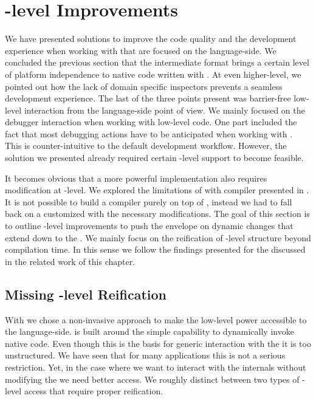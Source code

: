 \section{\VM-level Improvements}
We have presented solutions to improve the code quality and the development experience when working with \B that are focused on the language-side.
We concluded the previous section that the \VCPU intermediate format brings a certain level of platform independence to native code written with \B.
At even higher-level, we pointed out how the lack of domain specific inspectors prevents a seamless development experience.
The last of the three points present was barrier-free low-level interaction from the language-side point of view.
We mainly focused on the debugger interaction when working with low-level \B code.
One part included the fact that most debugging actions have to be anticipated when working with \B.
This is counter-intuitive to the default \PH development workflow.
However, the solution we presented already required certain \VM-level support to become feasible.

It becomes obvious that a more powerful \B implementation also requires modification at \VM-level.
We explored the limitations of \B with \NBJ \JIT compiler presented in .
It is not possible to build a \JIT compiler purely on top of \B, instead we had to fall back on a customized \VM with the necessary modifications.
The goal of this section is to outline \VM-level improvements to push the envelope on dynamic changes that extend down to the \VM.
We mainly focus on the reification of \VM-level structure beyond compilation time.
In this sense we follow the findings presented for the \Klein \VM discussed in the related work  of this chapter.


\subsection{Missing \VM-level Reification}
With \B we chose a non-invasive approach to make the low-level power accessible to the language-side.
\B is built around the simple capability to dynamically invoke native code.
Even though this is the basis for generic interaction with the \VM it is too unstructured.
We have seen that for many \B applications this is not a serious restriction.
Yet, in the case where we want to interact with the \VM internals without modifying the \VM we need better access.
We roughly distinct between two types of \VM-level access that require proper reification. 

